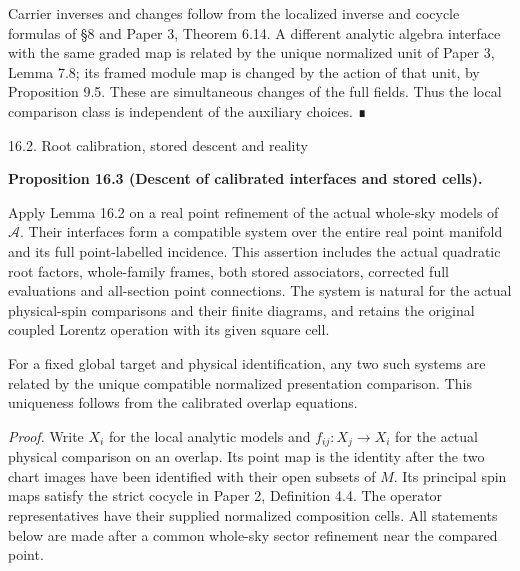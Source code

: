 \documentclass[
  english,
  11pt,
  reqno]{amsart}
\makeatletter
\newcommand{\paperstatementsection}{\@startsection{subsection}{2}%
  \z@{.5\linespacing\@plus.7\linespacing}{.35\baselineskip}%
  {\normalfont\bfseries}}
\newcommand{\paperfirststatement}[1]{%
  {\normalfont\bfseries #1\par}%
  \nobreak\@afterindenttrue\@afterheading}
\makeatother
\begin{document}
Carrier inverses and changes follow from the localized inverse and
cocycle formulas of §8 and Paper 3, Theorem 6.14. A different analytic
algebra interface with the same graded map is related by the unique
normalized unit of Paper 3, Lemma 7.8; its framed module map is changed
by the action of that unit, by Proposition 9.5. These are simultaneous
changes of the full fields. Thus the local comparison class is
independent of the auxiliary choices. ∎

\protect{}\label{sec:analytic-interface-descent}
\paperstatementsection{16.2. Root calibration, stored descent and
reality}\label{root-calibration-stored-descent-and-reality}
\paperfirststatement{\protect{}\label{prop:analytic-calibrated-interface-descent}Proposition 16.3 (Descent of calibrated interfaces and stored cells).}

Apply Lemma 16.2 on a real point refinement of the actual whole-sky
models of \(\mathcal A\). Their interfaces form a compatible system over
the entire real point manifold and its full point-labelled incidence.
This assertion includes the actual quadratic root factors, whole-family
frames, both stored associators, corrected full evaluations and
all-section point connections. The system is natural for the actual
physical-spin comparisons and their finite diagrams, and retains the
original coupled Lorentz operation with its given square cell.

For a fixed global target and physical identification, any two such
systems are related by the unique compatible normalized presentation
comparison. This uniqueness follows from the calibrated overlap
equations.

\emph{Proof.} Write \(X_i\) for the local analytic models and
\(f_{ij}:X_j\to X_i\) for the actual physical comparison on an overlap.
Its point map is the identity after the two chart images have been
identified with their open subsets of \(M\). Its principal spin maps
satisfy the strict cocycle in Paper 2, Definition 4.4. The operator
representatives have their supplied normalized composition cells. All
statements below are made after a common whole-sky sector refinement
near the compared point.
\end{document}
